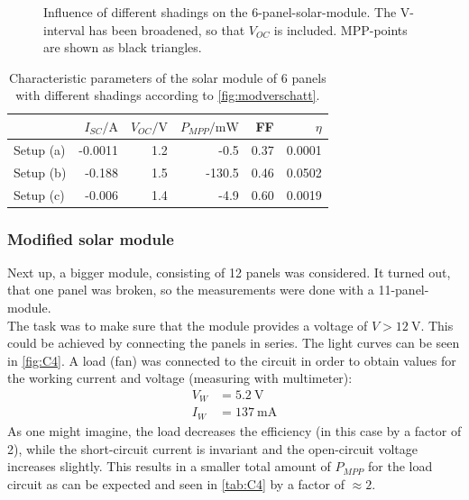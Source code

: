 \documentclass[english,  %
parskip=full,  %
headsepline]{scrartcl}
\begin{document}
\begin{figure}[H]
    \centering
    
    \caption{Influence of different shadings on the 6-panel-solar-module. The V-interval has been broadened, so that $V_{OC}$ is included. MPP-points are shown as black triangles.}
    \label{fig:C3}
\end{figure}
\begin{table}[H]

\centering
    \caption{Characteristic parameters of the solar module of 6 panels with different shadings according to \cref{fig:modverschatt}.}
    \label{tab:C3}
\begin{tabular}{lrrrrr}
\toprule
&$I_{SC} / \si{\ampere}$&$V_{OC} / \si{\volt}$&$P_{MPP}/ \si{\milli\watt}$&FF&$\eta$\\
\midrule
Setup (a) &  -0.0011&1.2&-0.5&0.37&0.0001 \\
Setup (b) &  -0.188&1.5&-130.5&0.46&0.0502 \\
Setup (c) &  -0.006&1.4&-4.9&0.60&0.0019\\
\bottomrule
\end{tabular}
\end{table}
\pagebreak
\subsubsection{Modified solar module}
Next up, a bigger module, consisting of 12 panels was considered. It turned out, that one panel was broken, so the measurements were done with a 11-panel-module.\\
The task was to make sure that the module provides a voltage of $V > \SI{12}{\volt}$. This could be achieved by connecting the panels in series. The light curves can be seen in \cref{fig:C4}. A load (fan) was connected to the circuit in order to obtain values for the working current and voltage (measuring with multimeter):
\begin{align*}
V_{W} &= \SI{5.2}{\volt} \\
I_{W} &=  \SI{137}{\milli \ampere}
\end{align*}
As one might imagine, the load decreases the efficiency (in this case by a factor of 2), while the short-circuit current is invariant and the open-circuit voltage increases slightly. This results in a smaller total amount of $P_{MPP}$ for the load circuit as can be expected and seen in \cref{tab:C4} by a factor of $\approx 2$.
\end{document}

